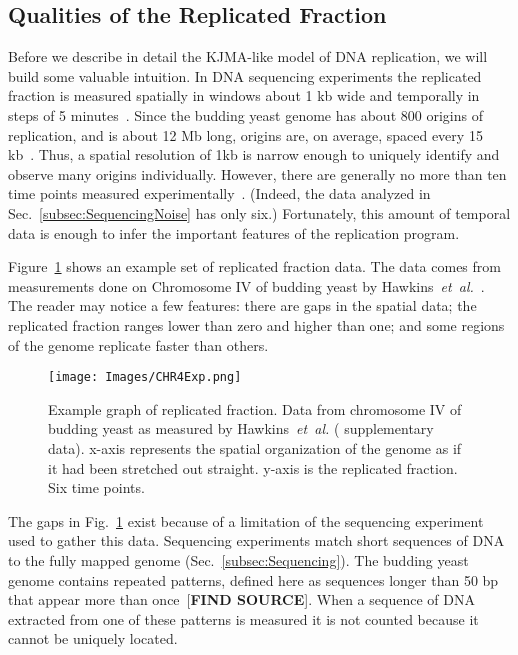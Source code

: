 	
		\subsection{Qualities of the Replicated Fraction}
		\label{subsec:QualitiesReplicatedFraction}
		
		Before we describe in detail the KJMA-like model of DNA replication, we will build some valuable intuition.
		In DNA sequencing experiments the replicated fraction is measured spatially in windows about 1 kb wide and temporally in steps of 5 minutes~\cite{StochasticTermination}.
		Since the budding yeast genome has about 800 origins of replication, and is about 12 Mb long, origins are, on average, spaced every 15 kb~\cite{OriDB,BuddingYeastSequence}.
		Thus, a spatial resolution of 1kb is narrow enough to uniquely identify and observe many origins individually. 
		However, there are generally no more than ten time points measured experimentally~\cite{StochasticTermination,DeepSeq,McCuneMicroArray}.
		(Indeed, the data analyzed in Sec.~\ref{subsec:SequencingNoise} has only six.)
		Fortunately, this amount of temporal data is enough to infer the important features of the replication program.
		
		Figure~\ref{fig:ReplicatedFractionExample} shows an example set of replicated fraction data.
		The data comes from measurements done on Chromosome IV of budding yeast by Hawkins~\emph{et~al.}~\cite{StochasticTermination}.
		The reader may notice a few features:
		there are gaps in the spatial data;
		the replicated fraction ranges lower than zero and higher than one;
		and some regions of the genome replicate faster than others.
		
		\begin{figure}[tbh]
			\begin{center}
				\texttt{[image: Images/CHR4Exp.png]}
			\end{center}
				\caption[Replicated Fraction of Chromosome IV of Budding Yeast]{\label{fig:ReplicatedFractionExample} Example graph of replicated fraction.
					Data from chromosome IV of budding yeast as measured by Hawkins~\emph{et~al.} (\cite{StochasticTermination} supplementary data).
					x-axis represents the spatial organization of the genome as if it had been stretched out straight.
					y-axis is the replicated fraction.
					Six time points.
				}
		\end{figure}
		
		The gaps in Fig.~\ref{fig:ReplicatedFractionExample} exist because of a limitation of the sequencing experiment used to gather this data.
		Sequencing experiments match short sequences of DNA to the fully mapped genome (Sec.~\ref{subsec:Sequencing}).
		The budding yeast genome contains repeated patterns, defined here as sequences longer than 50 bp that appear more than once~[\textbf{FIND SOURCE}].
		When a sequence of DNA extracted from one of these patterns is measured it is not counted because it cannot be uniquely located.
		
